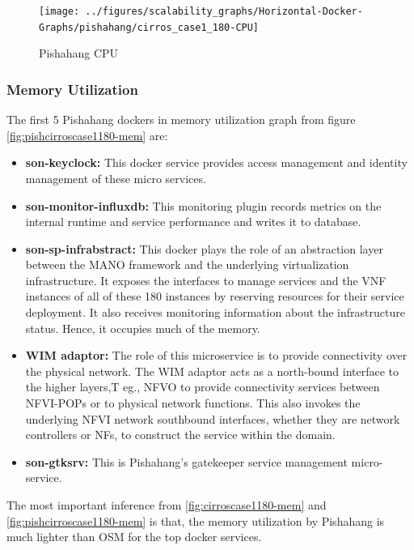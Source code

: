 \begin{figure}[h]
	\centering
	\texttt{[image: ../figures/scalability\_graphs/Horizontal-Docker-Graphs/pishahang/cirros\_case1\_180-CPU]}
	\caption{Pishahang CPU}
	\label{fig:pishcirroscase1180-cpu}
\end{figure}
\pagebreak
\subsubsection{Memory Utilization}
The first 5 Pishahang dockers in memory utilization graph  from figure \ref{fig:pishcirroscase1180-mem} are:

\begin{itemize}
	\item \textbf{son-keyclock:} This docker service provides access management and identity management of these micro services.
	\item \textbf{son-monitor-influxdb:} This monitoring plugin records metrics on the internal runtime and service performance and writes it to database.
	\item \textbf{son-sp-infrabstract:}  This docker plays the role of an abstraction layer between the MANO framework and the underlying virtualization infrastructure. It exposes the interfaces to manage services and the VNF instances of all of these 180 instances by reserving resources for their service deployment. It also receives monitoring information about the infrastructure status. Hence, it occupies much of the memory.
	
	\item \textbf{WIM adaptor:} The role of this microservice is to provide connectivity over the physical network. The WIM adaptor acts as a north-bound interface to the higher layers,T eg., NFVO to provide connectivity services between NFVI-POPs or to physical network functions. This also invokes the underlying NFVI network southbound interfaces, whether they are network controllers or NFs, to construct the service within the domain.
	
	\item \textbf{son-gtksrv:} This is Pishahang's gatekeeper service management micro-service.
	
\end{itemize}
 The most important inference from \ref{fig:cirroscase1180-mem} and \ref{fig:pishcirroscase1180-mem} is that, the memory utilization by Pishahang is much lighter than OSM for the top docker services.



